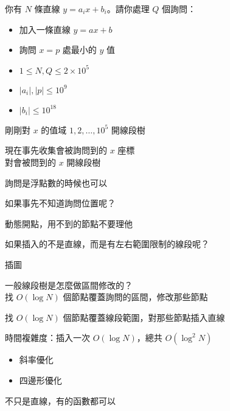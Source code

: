 \begin{frame}{}
    \begin{problem}
        你有 $N$ 條直線 $y = a_i x + b_i$。請你處理 $Q$ 個詢問：

        \begin{itemize}
            \item 加入一條直線 $y = ax + b$
            \item 詢問 $x = p$ 處最小的 $y$ 值
        \end{itemize}

        \begin{itemize}
            \item $1 \le N, Q \le 2 \times 10^5$
            \item $|a_i|, |p| \le 10^9$ 
            \item $|b_i| \le 10^{18}$
        \end{itemize}
    \end{problem}
\end{frame}

\begin{frame}{}
    剛剛對 $x$ 的值域 $1, 2, \dots, 10^5$ 開線段樹

    現在事先收集會被詢問到的 $x$ 座標 \\
    對會被問到的 $x$ 開線段樹

    詢問是浮點數的時候也可以
\end{frame}

\begin{frame}{}
    如果事先不知道詢問位置呢？

     {
        動態開點，用不到的節點不要理他
    }
\end{frame}

\begin{frame}{}
    如果插入的不是直線，而是有左右範圍限制的線段呢？

    \todo 插圖
\end{frame}

\begin{frame}{}
    一般線段樹是怎麼做區間修改的？
     {
        \\找 $O(\log N)$ 個節點覆蓋詢問的區間，修改那些節點
    }

     {
        找 $O(\log N)$ 個節點覆蓋線段範圍，對那些節點插入直線
    }

     {
        時間複雜度：插入一次 $O(\log N)$，總共 $O(\log^2N)$
    }
\end{frame}

\begin{frame}{}
    \begin{itemize}
        \item 斜率優化 
        \item<2> 四邊形優化 
    \end{itemize}

     {
        不只是直線，有的函數都可以
    }
\end{frame}

